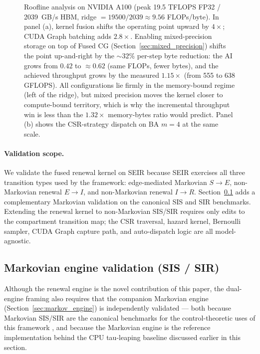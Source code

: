\documentclass[a4paper,fleqn]{cas-sc}
\theoremstyle{definition}
\theoremstyle{remark}
\begin{document}
\begin{figure}[!h]
\centering

\caption{Roofline analysis on NVIDIA A100 (peak 19.5 TFLOPS FP32 / 2039~GB/s HBM, ridge $= 19500/2039 \approx 9.56$ FLOPs/byte). In panel (a), kernel fusion shifts the operating point upward by $4\times$; CUDA Graph batching adds $2.8\times$. Enabling mixed-precision storage on top of Fused CG (Section~\ref{sec:mixed_precision}) shifts the point up-and-right by the $\sim\!32\%$ per-step byte reduction: the AI grows from $0.42$ to $\approx 0.62$ (same FLOPs, fewer bytes), and the achieved throughput grows by the measured $1.15\times$ (from 555 to 638 GFLOPS). All configurations lie firmly in the memory-bound regime (left of the ridge), but mixed precision moves the kernel closer to compute-bound territory, which is why the incremental throughput win is less than the $1.32\times$ memory-bytes ratio would predict. Panel (b) shows the CSR-strategy dispatch on BA $m{=}4$ at the same scale.}
\label{fig:roofline}
\end{figure}

\paragraph{Validation scope.}
We validate the fused renewal kernel on SEIR because SEIR exercises all three transition types used by the framework: edge-mediated Markovian $S \to E$, non-Markovian renewal $E \to I$, and non-Markovian renewal $I \to R$. Section~\ref{sec:markov_validation} adds a complementary Markovian validation on the canonical SIS and SIR benchmarks. Extending the renewal kernel to non-Markovian SIS/SIR requires only edits to the compartment transition map; the CSR traversal, hazard kernel, Bernoulli sampler, CUDA Graph capture path, and auto-dispatch logic are all model-agnostic.

\subsection{Markovian engine validation (SIS / SIR)}
\label{sec:markov_validation}

Although the renewal engine is the novel contribution of this paper, the dual-engine framing also requires that the companion Markovian engine (Section~\ref{sec:markov_engine}) is independently validated --- both because Markovian SIS/SIR are the canonical benchmarks for the control-theoretic uses of this framework \citep{nowzari2016analysis, watkins2019robust, preciado2014optimal}, and because the Markovian engine is the reference implementation behind the CPU tau-leaping baseline discussed earlier in this section.
\end{document}
